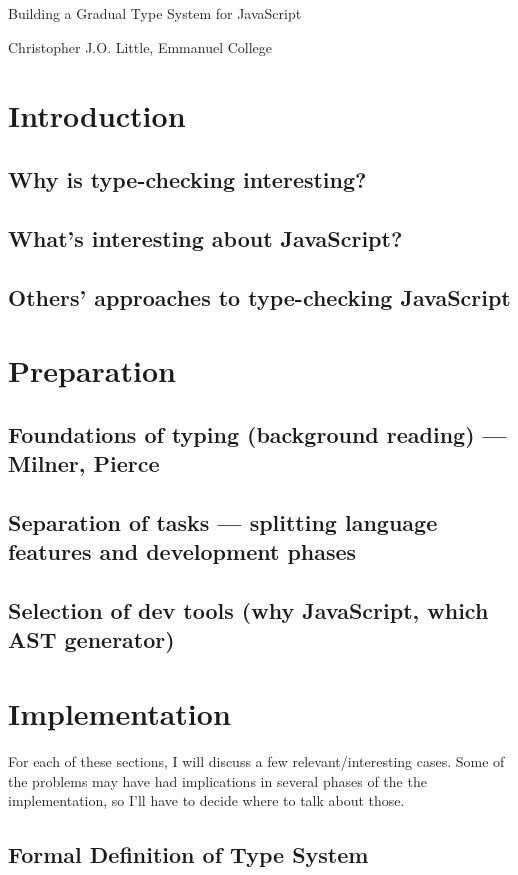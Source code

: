 \documentclass{article}
\begin{document}
	\vfil 
	\centerline{\Large Building a Gradual Type System for JavaScript }
	\vspace{0.4in}
	\centerline{\large Christopher J.O. Little, Emmanuel College}

	\section{Introduction}\label{introduction}
		\subsection{Why is type-checking interesting?}
		\subsection{What's interesting about JavaScript?}
		\subsection{Others' approaches to type-checking JavaScript}
	\section{Preparation}\label{preparation}
		\subsection{Foundations of typing (background reading) --- Milner, Pierce}
		\subsection{Separation of tasks --- splitting language features and development phases}
		\subsection{Selection of dev tools (why JavaScript, which AST generator)}
	\section{Implementation}\label{implementation}

		For each of these sections, I will discuss a few relevant/interesting
		cases. Some of the problems may have had implications in several
		phases of the the implementation, so I'll have to decide where to talk
		about those. 

	
		\subsection{Formal Definition of Type System}
\end{document}
